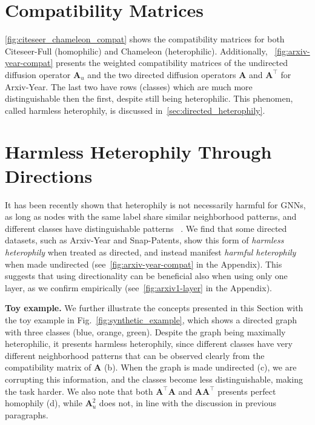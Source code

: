 \documentclass{article}
\theoremstyle{plain}
\theoremstyle{definition}
\theoremstyle{remark}
\begin{document}
\section{Compatibility Matrices}
\cref{fig:citeseer_chameleon_compat} shows the compatibility matrices for both Citeseer-Full (homophilic) and Chameleon (heterophilic). Additionally, ~\cref{fig:arxiv-year-compat} presents the weighted compatibility matrices of the undirected diffusion operator $\mathbf{A}_u$ and the two directed diffusion operators $\mathbf{A}$ and $\mathbf{A}^\top$ for Arxiv-Year. The last two have rows (classes) which are much more distinguishable then the first, despite still being heterophilic. This phenomen, called harmless heterophily, is discussed in~\cref{sec:directed_heterophily}.

\section{Harmless Heterophily Through Directions}
It has been recently shown that heterophily is not necessarily harmful for GNNs, as long as nodes with the same label share similar neighborhood patterns, and different classes have distinguishable patterns~\cite{ma2022is, luan2023graph} . We find that some directed datasets, such as Arxiv-Year and Snap-Patents, show this form of \textit{harmless heterophily} when treated as directed, and instead manifest \textit{harmful heterophily} when made undirected (see~\cref{fig:arxiv-year-compat} in the Appendix). This suggests that using directionality can be beneficial also when using only one layer, as we confirm empirically (see~\cref{fig:arxiv1-layer} in the Appendix).

\textbf{Toy example.} We further illustrate the concepts presented in this Section with the toy example in Fig.~\ref{fig:synthetic_example}, which shows a directed graph with three classes (blue, orange, green). Despite the graph being maximally heterophilic, it presents harmless heterophily, since different classes have very different neighborhood patterns that can be observed clearly from the compatibility matrix of $\mathbf{A}$ (b). When the graph is made undirected (c), we are corrupting this information, and the classes become less distinguishable, making the task harder. We also note that both $\mathbf{A}^\top\mathbf{A}$ and $\mathbf{A}\mathbf{A}^\top$ presents perfect homophily (d), while $\mathbf{A}_u^2$ does not, in line with the discussion in previous paragraphs.
\end{document}
